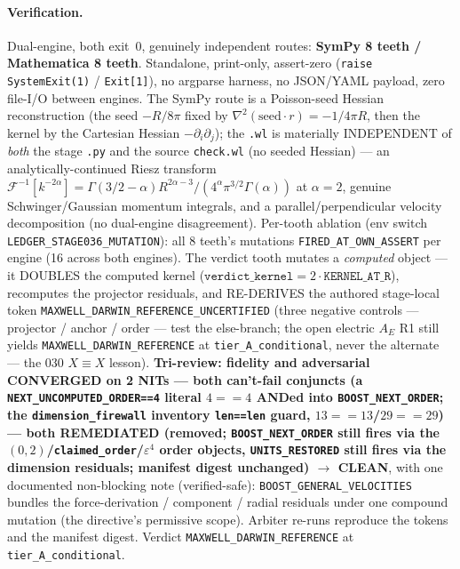 \paragraph{Verification.}
Dual-engine, both exit~0, genuinely independent routes: \textbf{SymPy 8 teeth /
Mathematica 8 teeth}. Standalone, print-only, assert-zero
(\texttt{raise SystemExit(1)} / \texttt{Exit[1]}), no argparse harness, no JSON/YAML
payload, zero file-I/O between engines. The SymPy route is a Poisson-seed Hessian
reconstruction (the seed \(-R/8\pi\) fixed by \(\nabla^2(\text{seed}\cdot r)=-1/4\pi R\),
then the kernel by the Cartesian Hessian \(-\partial_i\partial_j\)); the \texttt{.wl}
is materially INDEPENDENT of \emph{both} the stage \texttt{.py} and the source
\texttt{check.wl} (no seeded Hessian) --- an analytically-continued Riesz transform
\(\mathcal F^{-1}[k^{-2\alpha}]=\Gamma(3/2-\alpha)R^{2\alpha-3}/(4^\alpha\pi^{3/2}\Gamma(\alpha))\)
at \(\alpha=2\), genuine Schwinger/Gaussian momentum integrals, and a
parallel/perpendicular velocity decomposition (no dual-engine disagreement).
Per-tooth ablation (env switch \texttt{LEDGER\_STAGE036\_MUTATION}): all 8 teeth's
mutations \texttt{FIRED\_AT\_OWN\_ASSERT} per engine (16 across both engines). The
verdict tooth mutates a \emph{computed} object --- it DOUBLES the computed kernel
(\(\texttt{verdict\_kernel}=2\cdot\texttt{KERNEL\_AT\_R}\)), recomputes the projector
residuals, and RE-DERIVES the authored stage-local token
\texttt{MAXWELL\_DARWIN\_REFERENCE\_UNCERTIFIED} (three negative controls ---
projector / anchor / order --- test the else-branch; the open electric \(A_E\) R1
still yields \texttt{MAXWELL\_DARWIN\_REFERENCE} at \texttt{tier\_A\_conditional},
never the alternate --- the 030 \(X\equiv X\) lesson). \textbf{Tri-review: fidelity
and adversarial CONVERGED on 2 NITs --- both can't-fail conjuncts (a
\texttt{NEXT\_UNCOMPUTED\_ORDER==4} literal \(4==4\) ANDed into
\texttt{BOOST\_NEXT\_ORDER}; the \texttt{dimension\_firewall} inventory
\texttt{len==len} guard, \(13==13\)/\(29==29\)) --- both REMEDIATED (removed;
\texttt{BOOST\_NEXT\_ORDER} still fires via the \((0,2)\)/\texttt{claimed\_order}/\(\varepsilon^4\)
order objects, \texttt{UNITS\_RESTORED} still fires via the dimension residuals;
manifest digest unchanged) \(\to\) CLEAN}, with one documented non-blocking note
(verified-safe): \texttt{BOOST\_GENERAL\_VELOCITIES} bundles the
force-derivation / component / radial residuals under one compound mutation (the
directive's permissive scope). Arbiter re-runs reproduce the tokens and the
manifest digest. Verdict \texttt{MAXWELL\_DARWIN\_REFERENCE} at
\texttt{tier\_A\_conditional}.
